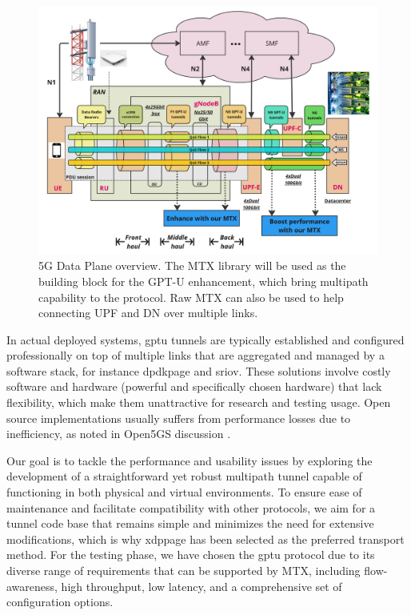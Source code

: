 \begin{figure}[H]
	\centering
	\includegraphics[width=1.0\textwidth]{resources/images/5g_dp_enhancement.PNG}
	\caption{5G Data Plane overview. The MTX library will be used as the building block for the GPT-U enhancement, which bring multipath capability to the protocol. Raw MTX can also be used to help connecting UPF and DN over multiple links.}
    \label{fig:related_work:5g_dp_enhancement}
\end{figure}

In actual deployed systems, \ac{gptu} tunnels are typically established and configured professionally on top of multiple links that are aggregated and managed by a software stack, for instance \ac{dpdkpage} and \ac{sriov}.
These solutions involve costly software and hardware (powerful and specifically chosen hardware) that lack flexibility, which make them unattractive for research and testing usage.
Open source implementations usually suffers from performance losses due to inefficiency, as noted in Open5GS discussion \cite{open5gs_github_dpdk}\cite{open5gs_github_udp_perf_cap}.

Our goal is to tackle the performance and usability issues by exploring the development of a straightforward yet robust multipath tunnel capable of functioning in both physical and virtual environments. 
To ensure ease of maintenance and facilitate compatibility with other protocols, we aim for a tunnel code base that remains simple and minimizes the need for extensive modifications, which is why \ac{xdppage} has been selected as the preferred transport method.
For the testing phase, we have chosen the \ac{gptu} protocol due to its diverse range of requirements that can be supported by MTX, including flow-awareness, high throughput, low latency, and a comprehensive set of configuration options.


